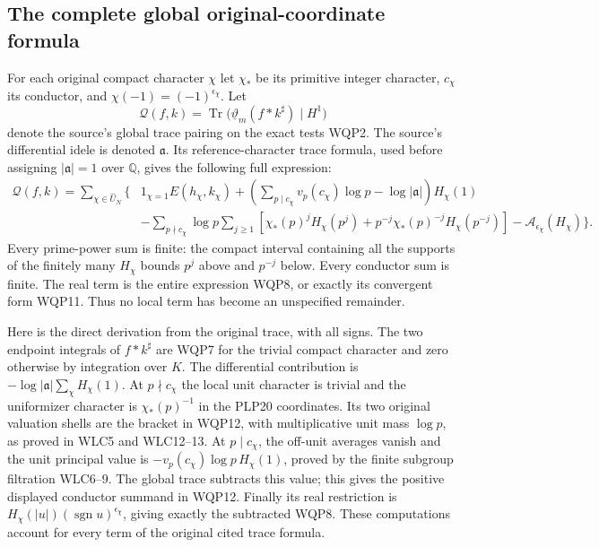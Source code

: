 \subsection{The complete global original-coordinate formula}

For each original compact character $\chi$ let $\chi_*$ be its primitive
integer character, $c_\chi$ its conductor, and
$\chi(-1)=(-1)^{\epsilon_\chi}$. Let
\[
 \mathcal Q(f,k)=
 \operatorname{Tr}\bigl(\underline\vartheta_m(f*k^\sharp)\mid H^1\bigr)
\]
denote the source's global trace pairing on the exact tests WQP2.
The source's differential idele is denoted $\mathfrak a$. Its
reference-character trace formula, used before assigning
$|\mathfrak a|=1$ over $\mathbb Q$, gives the following full expression:
\begin{equation}\tag{WQP12}
 \begin{split}
 \mathcal Q(f,k)=\sum_{\chi\in\widehat U_N}\bigg\{&
  1_{\chi=1}E(h_\chi,k_\chi)
 +\left(\sum_{p\mid c_\chi}v_p(c_\chi)\log p
                       -\log|\mathfrak a|\right)H_\chi(1)\\
 &-\sum_{p\nmid c_\chi}\log p\sum_{j\ge1}
     \left[\chi_*(p)^jH_\chi(p^j)
       +p^{-j}\chi_*(p)^{-j}H_\chi(p^{-j})\right]
 -\mathcal A_{\epsilon_\chi}(H_\chi)\bigg\}.
 \end{split}
\end{equation}
Every prime-power sum is finite: the compact interval containing all
the supports of the finitely many $H_\chi$ bounds $p^j$ above and
$p^{-j}$ below. Every conductor sum is finite. The real term is the
entire expression WQP8, or exactly its convergent form WQP11.
Thus no local term has become an unspecified remainder.

Here is the direct derivation from the original trace, with all signs.
The two endpoint integrals of $f*k^\sharp$ are WQP7 for the trivial
compact character and zero otherwise by integration over $K$.
The differential contribution is
$-\log|\mathfrak a|\sum_\chi H_\chi(1)$.
At $p\nmid c_\chi$ the local unit character is trivial and the
uniformizer character is $\chi_*(p)^{-1}$ in the PLP20 coordinates.
Its two original valuation shells are the bracket in WQP12,
with multiplicative unit mass $\log p$, as proved in WLC5 and
WLC12--13. At $p\mid c_\chi$, the off-unit averages vanish and
the unit principal value is $-v_p(c_\chi)\log p\,H_\chi(1)$,
proved by the finite subgroup filtration WLC6--9. The global trace
subtracts this value; this gives the positive displayed conductor
summand in WQP12. Finally its real restriction is
$H_\chi(|u|)(\operatorname{sgn}u)^{\epsilon_\chi}$, giving
exactly the subtracted WQP8. These computations account for
every term of the original cited trace formula.

